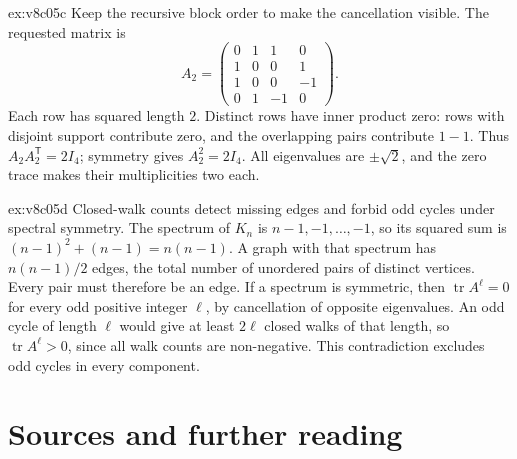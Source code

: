 \begin{solution}{ex:v8c05c}
\idea Keep the recursive block order to make the cancellation visible.
\writeup The requested matrix is
\[
A_2=\begin{pmatrix}0&1&1&0\\1&0&0&1\\1&0&0&-1\\0&1&-1&0\end{pmatrix}.
\]
Each row has squared length $2$. Distinct rows have inner product zero: rows with disjoint support contribute zero, and the overlapping pairs contribute $1-1$. Thus $A_2A_2^{\mathsf T}=2I_4$; symmetry gives $A_2^2=2I_4$. All eigenvalues are $\pm\sqrt2$, and the zero trace makes their multiplicities two each.
\end{solution}

\begin{solution}{ex:v8c05d}
\idea Closed-walk counts detect missing edges and forbid odd cycles under spectral symmetry.
\writeup The spectrum of $K_n$ is $n-1,-1,\ldots,-1$, so its squared sum is $(n-1)^2+(n-1)=n(n-1)$. A graph with that spectrum has $n(n-1)/2$ edges, the total number of unordered pairs of distinct vertices. Every pair must therefore be an edge.
If a spectrum is symmetric, then $\operatorname{tr}A^\ell=0$ for every odd positive integer $\ell$, by cancellation of opposite eigenvalues. An odd cycle of length $\ell$ would give at least $2\ell$ closed walks of that length, so $\operatorname{tr}A^\ell>0$, since all walk counts are non-negative. This contradiction excludes odd cycles in every component.
\end{solution}

\section*{Sources and further reading}

